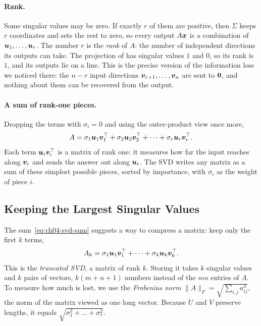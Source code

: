\paragraph{Rank.}
Some singular values may be zero. If exactly $r$ of them are positive,
then $\Sigma$ keeps $r$ coordinates and sets the rest to zero, so every
output $A\bm{x}$ is a combination of $\bm{u}_1, \dots, \bm{u}_r$. The
number $r$ is the \emph{rank} of $A$: the number of independent
directions its outputs can take. The projection of
 has singular values $1$ and $0$, so its
rank is $1$, and its outputs lie on a line. This is the precise version of
the information loss we noticed there: the $n - r$ input directions
$\bm{v}_{r+1}, \dots, \bm{v}_n$ are sent to $\bm{0}$, and nothing about
them can be recovered from the output.

\paragraph{A sum of rank-one pieces.}
Dropping the terms with $\sigma_i = 0$ and using the outer-product view
once more,
\begin{equation}
  A = \sigma_1 \bm{u}_1 \bm{v}_1^\top + \sigma_2 \bm{u}_2
  \bm{v}_2^\top + \dots + \sigma_r \bm{u}_r \bm{v}_r^\top .
  \label{eq:ch04-svd-sum}
\end{equation}
Each term $\bm{u}_i \bm{v}_i^\top$ is a matrix of rank one: it measures
how far the input reaches along $\bm{v}_i$ and sends the answer out along
$\bm{u}_i$. The SVD writes any matrix as a sum of these simplest
possible pieces, sorted by importance, with $\sigma_i$ as the weight of
piece $i$.

\subsection{Keeping the Largest Singular Values}
\label{sec:ch04-low-rank}

The sum~\eqref{eq:ch04-svd-sum} suggests a way to compress a matrix: keep
only the first $k$ terms,
\[
  A_k = \sigma_1 \bm{u}_1 \bm{v}_1^\top + \dots
    + \sigma_k \bm{u}_k \bm{v}_k^\top .
\]
This is the \emph{truncated SVD}, a matrix of rank $k$. Storing it takes
$k$ singular values and $k$ pairs of vectors, $k(m + n + 1)$ numbers
instead of the $mn$ entries of $A$. To measure how much is lost, we use
the \emph{Frobenius norm} $\|A\|_F = \sqrt{\sum_{i,j} a_{ij}^2}$, the norm
of the matrix viewed as one long vector. Because $U$ and $V$ preserve
lengths, it equals $\sqrt{\sigma_1^2 + \dots + \sigma_r^2}$.

